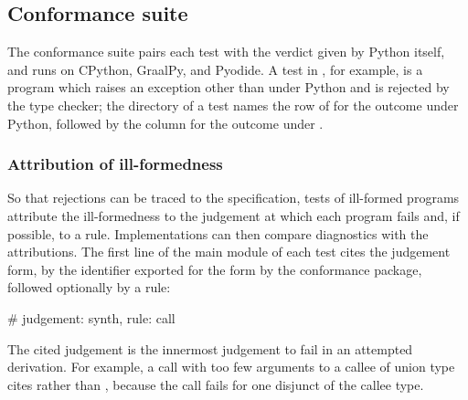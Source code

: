 \subsection{Conformance suite}
\label{sec:conformance-suite}

The conformance suite pairs each test with the verdict given by Python itself, and runs on CPython,
GraalPy, and Pyodide. A test in , for example, is a program which raises an exception other than  under Python and is rejected by the \PurePy type checker; the directory of a test names the row of  for the outcome under Python, followed by the column for the outcome under \PurePy. 


\FloatBarrier

\subsubsection{Attribution of ill-formedness}\label{sec:ill-formedness-attribution}

So that rejections can be traced to the specification, tests of ill-formed programs attribute the ill-formedness to
the judgement at which each program fails and, if possible, to a rule. Implementations can then compare diagnostics
with the attributions. The first line of the main module of each test cites the judgement form, by the identifier
exported for the form by the conformance package, followed optionally by a rule:
\begin{python}
# judgement: synth, rule: call
\end{python}
The cited judgement is the innermost judgement to fail in an attempted derivation. For example, a call with too few
arguments to a callee of union type cites  rather than , because the call fails for
one disjunct of the callee type.


